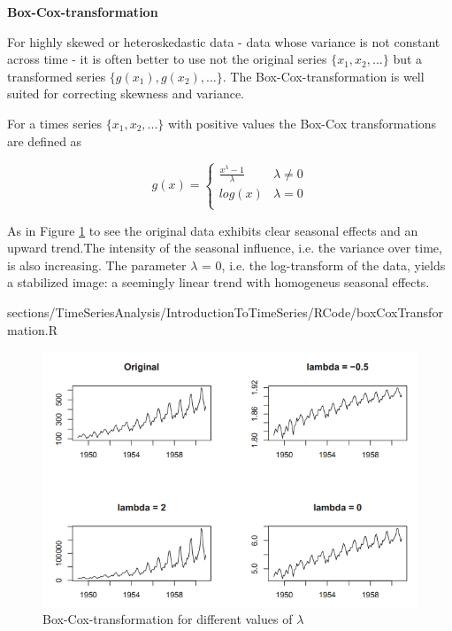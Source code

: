 			\RTheory
			{
				\textbf{Box-Cox-transformation}
				
				\vfill
				
				For highly skewed or heteroskedastic data - data whose variance is not constant across time - it is often better to use not the original series $\{x_1, x_2, ...\}$ but a transformed series $\{g(x_1), g(x_2),...\}$. The Box-Cox-transformation is well suited for correcting skewness and variance.
				
				\vfill
				
				\hfill
				
				\break
				For a times series $\{x_1, x_2, . . . \}$ with positive values the Box-Cox transformations are defined as
				
				$$ g(x)=
					\begin{cases}
							\frac{x^{\lambda}-1}{\lambda} &\lambda \neq 0\\
							log(x) &\lambda = 0\\
					\end{cases}$$
					
				As in Figure \ref{Fig:boxCox} to see the original data exhibits clear seasonal effects and an upward trend.The intensity of
				the seasonal influence, i.e. the variance over time, is also increasing. The parameter $\lambda$ = 0, i.e. the log-transform of the data, yields a stabilized image: a
				seemingly linear trend with homogeneus seasonal effects.
			}
			{
				sections/TimeSeriesAnalysis/IntroductionToTimeSeries/RCode/boxCoxTransformation.R
			}
			
			\begin{figure}[H]\centering
				\includegraphics[width=0.7\linewidth]{images/boxCox.png}
				\caption{Box-Cox-transformation for different values of $\lambda$}
				\label{Fig:boxCox}
			\end{figure}
			
